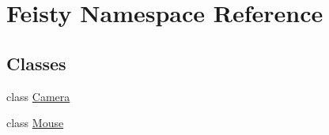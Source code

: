 \hypertarget{namespace_feisty}{
\section{Feisty Namespace Reference}
\label{namespace_feisty}
}
\subsection*{Classes}
\begin{DoxyCompactItemize}
\item 
class \hyperlink{class_feisty_1_1_camera}{Camera}
\item 
class \hyperlink{class_feisty_1_1_mouse}{Mouse}
\end{DoxyCompactItemize}
